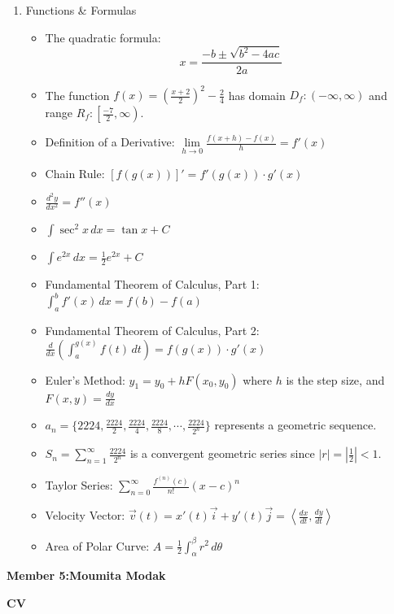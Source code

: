 \documentclass{article}
\begin{document}
\begin{enumerate}
    \item Functions \& Formulas
    \begin{itemize}
        \item The quadratic formula:
        \[
        x = \frac{-b \pm \sqrt{b^2 - 4ac}}{2a}
        \]
        \item The function $f(x) = \left(\frac{x+2}{2}\right)^2 - \frac{2}{4}$ has domain $D_f : (-\infty,\infty)$ and range $R_f : \left[\frac{-7}{2},\infty\right)$.
        \item Definition of a Derivative: $\lim\limits_{h \to 0} \frac{f(x+h)-f(x)}{h} = f'(x)$
        \item Chain Rule: $\left[f(g(x))\right]' = f'(g(x)) \cdot g'(x)$
        \item $\frac{d^2y}{dx^2} = f''(x)$
        \item $\int \sec^2 x \,dx = \tan x + C$
        \item $\int e^{2x} \,dx = \frac{1}{2}e^{2x} + C$
        \item Fundamental Theorem of Calculus, Part 1: $\int_a^b f'(x) \,dx = f(b) - f(a)$
        \item Fundamental Theorem of Calculus, Part 2: $\frac{d}{dx} \left( \int_a^{g(x)} f(t) \,dt \right) = f(g(x)) \cdot g'(x)$
        \item Euler's Method: $y_1 = y_0 + hF(x_0, y_0)$ where $h$ is the step size, and $F(x, y) = \frac{dy}{dx}$
        \item $a_n = \{2224, \frac{2224}{2}, \frac{2224}{4}, \frac{2224}{8}, \cdots, \frac{2224}{2^n} \}$ represents a geometric sequence.
        \item $S_n = \sum_{n=1}^{\infty} \frac{2224}{2^n}$ is a convergent geometric series since $\left|r\right| = \left|\frac{1}{2}\right| < 1$.
        \item Taylor Series: $\sum_{n=0}^{\infty} \frac{f^{(n)}(c)}{n!} (x - c)^n$
        \item Velocity Vector: $\vec{v}(t) = x'(t)\vec{i} + y'(t)\vec{j} = \left\langle \frac{dx}{dt}, \frac{dy}{dt} \right\rangle$
        \item Area of Polar Curve: $A = \frac{1}{2} \int_{\alpha}^{\beta} r^2 \,d\theta$
    \end{itemize}
\end{enumerate}
\newpage 
\begin{center}
\textbf{\LARGE{{Member 5:Moumita Modak}}} 
\end{center}
\begin{center}
    \Huge\textbf{CV}
\end{center}   
\end{document}
